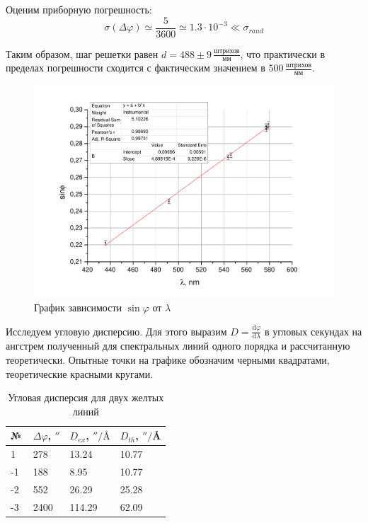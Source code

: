 \documentclass[a4paper,12pt]{article}
\newcommand{\dif}{\mathrm{d}}
\begin{document}
		Оценим приборную погрешность: $$
		\sigma(\Delta\varphi) \simeq \frac{5}{3600} \simeq 1.3\cdot10^{-3} \ll \sigma_{rand}
		$$
		
		Таким образом, шаг решетки равен $d = 488 \pm 9\, \frac{\text{штрихов}}{\text{мм}}$, что практически в пределах погрешности сходится с фактическим значением в $500\,\frac{\text{штрихов}}{\text{мм}}$.
		
		\begin{figure}[h]
			\caption{График зависимости $\sin\varphi$ от $\lambda$}
			\centering
			\label{pic1}
			\includegraphics[width = 0.8\linewidth]{graph1}
		\end{figure}

		
		
		Исследуем угловую дисперсию. Для этого выразим $D = \frac{\dif \varphi}{\dif\lambda}$ в угловых секундах на ангстрем полученный для спектральных линий одного порядка и рассчитанную теоретически. Опытные точки на графике обозначим черными квадратами, теоретические красными кругами.
		
		\begin{table}[h]
			\centering
			\caption{Угловая дисперсия для двух желтых линий}
			\label{table2}
			\begin{tabular}{|l|l|l|l|}
				\hline
				№\newline\,  & $\Delta\varphi$, $''$ & $D_{ex}$, $''/\text{\AA}$  & $D_{th}$, $''/$\AA      \\ \hline
				1  & 278  & 13.24  & 10.77 \\ \hline
				-1 & 188  & 8.95   & 10.77 \\ \hline
				-2 & 552  & 26.29  & 25.28 \\ \hline
				-3 & 2400 & 114.29 & 62.09 \\ \hline
			\end{tabular}
		\end{table}
		
\end{document}
